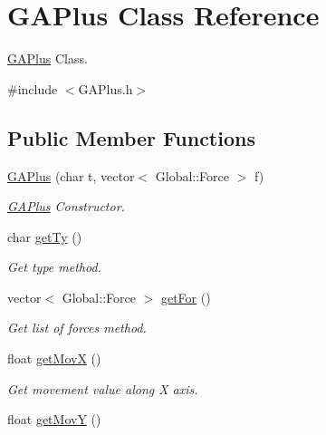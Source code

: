 \hypertarget{classGAPlus}{\section{G\-A\-Plus Class Reference}
\label{classGAPlus}
}


\hyperlink{classGAPlus}{G\-A\-Plus} Class.  




{\ttfamily \#include $<$G\-A\-Plus.\-h$>$}

\subsection*{Public Member Functions}
\begin{DoxyCompactItemize}
\item 
\hyperlink{classGAPlus_ac6953ed1932735d5f916b24f1298f3ab}{G\-A\-Plus} (char t, vector$<$ Global\-::\-Force $>$ f)
\begin{DoxyCompactList}\small\item\em \hyperlink{classGAPlus}{G\-A\-Plus} Constructor. \end{DoxyCompactList}\item 
char \hyperlink{classGAPlus_aadfbeaa73754fc498542ee0faa879912}{get\-Ty} ()
\begin{DoxyCompactList}\small\item\em Get type method. \end{DoxyCompactList}\item 
vector$<$ Global\-::\-Force $>$ \hyperlink{classGAPlus_a424b0920996c254e25f95f03d553d7d7}{get\-For} ()
\begin{DoxyCompactList}\small\item\em Get list of forces method. \end{DoxyCompactList}\item 
\hypertarget{classGAPlus_a9743f921683de213d9f66abffd6970c3}{float \hyperlink{classGAPlus_a9743f921683de213d9f66abffd6970c3}{get\-Mov\-X} ()}\label{classGAPlus_a9743f921683de213d9f66abffd6970c3}

\begin{DoxyCompactList}\small\item\em Get movement value along X axis. \end{DoxyCompactList}\item 
\hypertarget{classGAPlus_acffcea1f1028eec9ed47c71c6830ef87}{float \hyperlink{classGAPlus_acffcea1f1028eec9ed47c71c6830ef87}{get\-Mov\-Y} ()}\label{classGAPlus_acffcea1f1028eec9ed47c71c6830ef87}


\end{DoxyCompactItemize}
